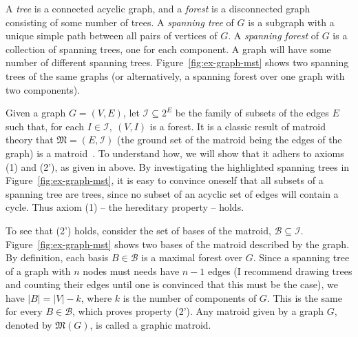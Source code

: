 A \textit{tree} is a connected acyclic graph, and a \textit{forest} is a disconnected graph consisting of some number of trees. A \textit{spanning tree} of $G$ is a subgraph with a unique simple path between all pairs of vertices of $G$. A \textit{spanning forest} of $G$ is a collection of spanning trees, one for each component. A graph will have some number of different spanning trees. Figure~\ref{fig:ex-graph-mst} shows two spanning trees of the same graphs (or alternatively, a spanning forest over one graph with two components).

Given a graph $G=(V,E)$, let $\mathcal{I} \subseteq 2^E$ be the family of subsets of the edges $E$ such that, for each $I \in \mathcal{I},\ (V, I)$ is a forest. It is a classic result of matroid theory that $\mathfrak{M} = (E, \mathcal{I})$ (the ground set of the matroid being the edges of the graph) is a matroid~\cite[p.~657]{schrijver-2003}. To understand how, we will show that it adhers to axioms (1) and (2'), as given in above. By investigating the highlighted spanning trees in Figure~\ref{fig:ex-graph-mst}, it is easy to convince oneself that all subsets of a spanning tree are trees, since no subset of an acyclic set of edges will contain a cycle. Thus axiom (1) -- the hereditary property -- holds. 

To see that (2') holds, consider the set of bases of the matroid, $\mathcal{B} \subseteq \mathcal{I}$. Figure~\ref{fig:ex-graph-mst} shows two bases of the matroid described by the graph. By definition, each basis $B \in \mathcal{B}$ is a maximal forest over $G$. Since a spanning tree of a graph with $n$ nodes must needs have $n-1$ edges (I recommend drawing trees and counting their edges until one is convinced that this must be the case), we have $|B| = |V| - k$, where $k$ is the number of components of $G$. This is the same for every $B \in \mathcal{B}$, which proves property (2'). Any matroid given by a graph $G$, denoted by $\mathfrak{M}(G)$, is called a graphic matroid.

